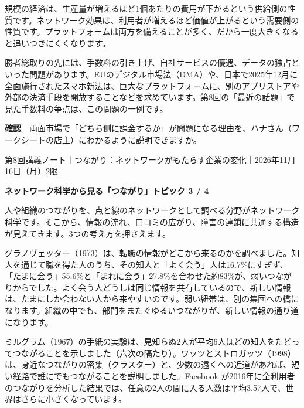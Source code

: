 \documentclass[paper=a4paper,fontsize=10pt,line_length=170mm,number_of_lines=46,baselineskip=1.6zw]{jlreq}
\newcommand\topichead[4]{%
  {\sffamily\footnotesize\color{grayt}#1\par}\vspace{1.5mm}
  {\sffamily\bfseries\LARGE #4}\hfill\colorbox{accent}{\sffamily\footnotesize\bfseries トピック #2 / #3}\par
  \vspace{1.2mm}{\color{ink}\hrule height 0.6pt}\vspace{3mm}}
\newcommand\subhead[1]{\par\vspace{2.6mm}{\sffamily\bfseries\large #1}\par\vspace{1.3mm}}
\begin{document}
\subhead{規模の経済との違い}
規模の経済は、生産量が増えるほど1個あたりの費用が下がるという供給側の性質です。ネットワーク効果は、利用者が増えるほど価値が上がるという需要側の性質です。プラットフォームは両方を備えることが多く、だから一度大きくなると追いつきにくくなります。\par\vspace{1.2mm}
\subhead{支配力と競争政策}
勝者総取りの先には、手数料の引き上げ、自社サービスの優遇、データの独占といった問題があります。EUのデジタル市場法（DMA）や、日本で2025年12月に全面施行されたスマホ新法は、巨大なプラットフォームに、別のアプリストアや外部の決済手段を開放することなどを求めています。第8回の「最近の話題」で見た手数料の争点は、この問題の一例です。\par\vspace{1.2mm}
\begin{checkbox}
{\sffamily\bfseries 確認}　両面市場で「どちら側に課金するか」が問題になる理由を、ハナさん（ワークシートの店主）にわかるように説明できますか。\par
\end{checkbox}
\clearpage
\topichead{第8回講義ノート｜つながり：ネットワークがもたらす企業の変化｜2026年11月16日（月）2限}{3}{4}{ネットワーク科学から見る「つながり」}
人や組織のつながりを、点と線のネットワークとして調べる分野がネットワーク科学です。そこから、情報の流れ、口コミの広がり、障害の連鎖に共通する構造が見えてきます。3つの考え方を押さえます。\par\vspace{1.2mm}
\subhead{弱い紐帯の強さ}
グラノヴェッター（1973）は、転職の情報がどこから来るのかを調べました。知人を通じて職を得た人のうち、その知人と「よく会う」人は16.7\%にすぎず、「たまに会う」55.6\%と「まれに会う」27.8\%を合わせた約83\%が、弱いつながりからでした。よく会う人どうしは同じ情報を共有しているので、新しい情報は、たまにしか会わない人から来やすいのです。弱い紐帯は、別の集団への橋になります。組織の中でも、部門をまたぐゆるいつながりが、新しい情報の通り道になります。\par\vspace{1.2mm}
\subhead{スモールワールド}
ミルグラム（1967）の手紙の実験は、見知らぬ2人が平均6人ほどの知人をたどってつながることを示しました（六次の隔たり）。ワッツとストロガッツ（1998）は、身近なつながりの密集（クラスター）と、少数の遠くへの近道があれば、短い経路で誰にでもつながることを説明しました。Facebook が2016年に全利用者のつながりを分析した結果では、任意の2人の間に入る人数は平均3.57人で、世界はさらに小さくなっています。\par\vspace{1.2mm}
\end{document}
